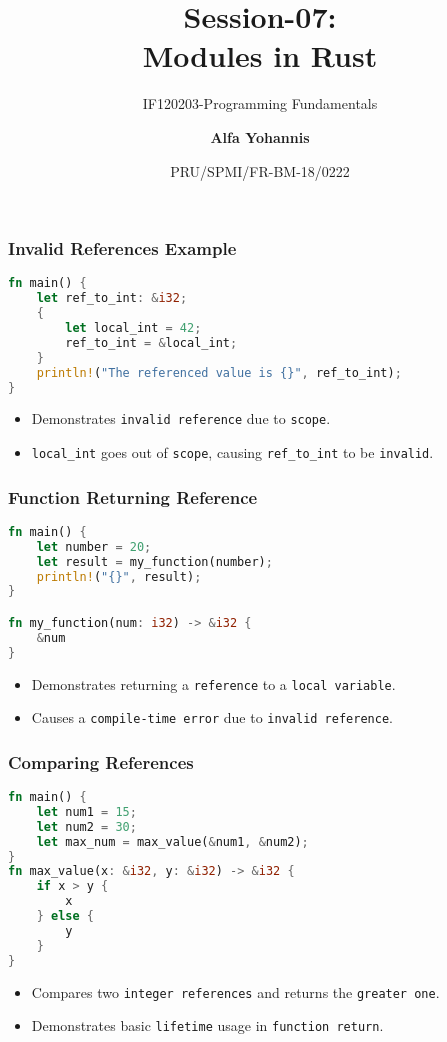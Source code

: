 \documentclass[aspectratio=169, table]{beamer}
\subtitle{IF120203-Programming Fundamentals}
\title{Session-07:\\\LARGE{Modules in Rust}\\ \vspace{10pt}}
\date[Serial]{\scriptsize {PRU/SPMI/FR-BM-18/0222}}
\author[Pradita]{\small{\textbf{Alfa Yohannis}}}
\begin{document}
\frame{\titlepage}

\begin{frame}[fragile]
\frametitle{Invalid References Example}
\begin{lstlisting}[language=Rust]
fn main() {
	let ref_to_int: &i32;
	{
		let local_int = 42;
		ref_to_int = &local_int;
	}
	println!("The referenced value is {}", ref_to_int);
}
\end{lstlisting}
\begin{itemize}
\item Demonstrates \texttt{invalid reference} due to \texttt{scope}.
\item \texttt{local\_int} goes out of \texttt{scope}, causing \texttt{ref\_to\_int} to be \texttt{invalid}.
\end{itemize}
\end{frame}

\begin{frame}[fragile]
\frametitle{Function Returning Reference}
\begin{lstlisting}[language=Rust]
fn main() {
	let number = 20;
	let result = my_function(number);
	println!("{}", result);
}

fn my_function(num: i32) -> &i32 {
	&num
}
\end{lstlisting}
\begin{itemize}
\item Demonstrates returning a \texttt{reference} to a \texttt{local variable}.
\item Causes a \texttt{compile-time error} due to \texttt{invalid reference}.
\end{itemize}
\end{frame}

\begin{frame}[fragile]
\frametitle{Comparing References}
\vspace{15pt}
\begin{lstlisting}[language=Rust]
fn main() {
	let num1 = 15;
	let num2 = 30;
	let max_num = max_value(&num1, &num2);
}
fn max_value(x: &i32, y: &i32) -> &i32 {
	if x > y {
		x
	} else {
		y
	}
}
\end{lstlisting}
\begin{itemize}
\item Compares two \texttt{integer references} and returns the \texttt{greater one}.
\item Demonstrates basic \texttt{lifetime} usage in \texttt{function return}.
\end{itemize}
\end{frame}
\end{document}

